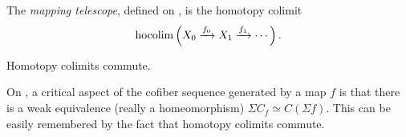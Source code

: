 \begin{example} The \textit{mapping telescope}, defined on \cite[p.138]{Hatcher}, is the homotopy colimit
\begin{align*}
    \mathop{\operatorname*{hocolim}}\left(X_0 \xrightarrow{f_0} X_1 \xrightarrow{f_1} \cdots \right).
\end{align*}

\end{example}




\begin{theorem} \cite[Theorem~24.9]{chacholski} Homotopy colimits commute.
\end{theorem}

\begin{corollary} On \cite[p.57]{May}, a critical aspect of the cofiber sequence generated by a map $f$ is that there is a weak equivalence (really a homeomorphism) $\Sigma C_f \simeq C(\Sigma f)$. This can be easily remembered by the fact that homotopy colimits commute.
\end{corollary}


